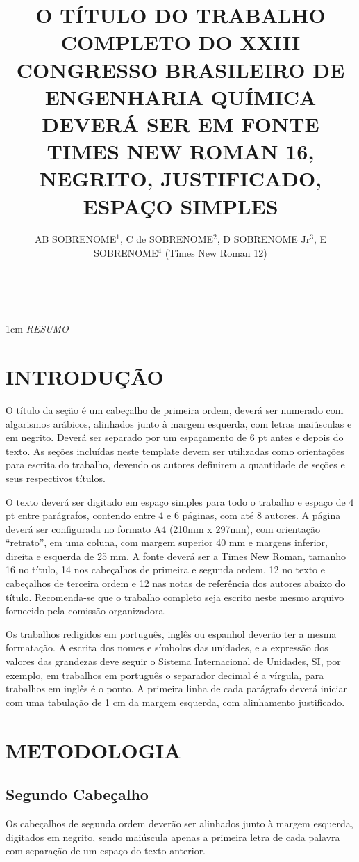 \documentclass[12pt,a4paper]{article}
\title{O TÍTULO DO TRABALHO COMPLETO DO XXIII CONGRESSO BRASILEIRO DE ENGENHARIA QUÍMICA DEVERÁ SER EM FONTE TIMES NEW ROMAN 16, NEGRITO, JUSTIFICADO, ESPAÇO SIMPLES}
\author{AB SOBRENOME$^1$, C de SOBRENOME$^2$, D SOBRENOME Jr$^3$, E SOBRENOME$^4$ (Times New Roman 12)}
\affiliation{%
$^1$ Universidade Federal da Bahia, Escola Politécnica, Departamento de Engenharia Química

$^2$ SENAI CIMATEC — Centro Integrado de Manufatura e Tecnologia

$^3$ Universidade Salvador

$^4$ Instituto Federal de Educação, Ciência e Tecnologia - Bahia

E-mail para contato: nome@wxyz.br
}
\makeatletter
\def\@affiliation{}
\def\@abstract{}
\renewcommand\maketitle{
   \vspace*{-1cm}
   {\noindent\Large\bfseries\@title\justifying}\\
   \begin{center}
   {\@author}   
   \end{center}
   
   \begin{center}
   {\setlength{\parskip}{0pt}
   \@affiliation
   }
   \end{center}

    \vspace*{\baselineskip}
   
    \begin{addmargin}[1cm]{1cm}
    {\itshape\noindent RESUMO-\@abstract}
    \end{addmargin}
    
  }
\makeatother
\begin{document}
\maketitle

\section{INTRODUÇÃO}

O título da seção é um cabeçalho de primeira ordem, deverá ser numerado com algarismos arábicos, alinhados junto à margem esquerda, com letras maiúsculas e em negrito. Deverá ser separado por um espaçamento de 6 pt antes e depois do texto. As seções incluídas neste template devem ser utilizadas como orientações para escrita do trabalho, devendo os autores definirem a quantidade de seções e seus respectivos títulos.

O texto deverá ser digitado em espaço simples para todo o trabalho e espaço de 4 pt entre parágrafos, contendo entre 4 e 6 páginas, com até 8 autores. A página deverá ser configurada no formato A4 (210mm x 297mm), com orientação ``retrato'', em uma coluna, com margem superior 40 mm e margens inferior, direita e esquerda de 25 mm. A fonte deverá ser a Times New Roman, tamanho 16 no título, 14 nos cabeçalhos de primeira e segunda ordem, 12 no texto e cabeçalhos de terceira ordem e 12 nas notas de referência dos autores abaixo do título. Recomenda-se que o trabalho completo seja escrito neste mesmo arquivo fornecido pela comissão organizadora.

Os trabalhos redigidos em português, inglês ou espanhol deverão ter a mesma formatação. A escrita dos nomes e símbolos das unidades, e a expressão dos valores das grandezas deve seguir o Sistema Internacional de Unidades, SI, por exemplo, em trabalhos em português o separador decimal é a vírgula, para trabalhos em inglês é o ponto.  A primeira linha de cada parágrafo deverá iniciar com uma tabulação de 1 cm da margem esquerda, com alinhamento justificado. 

\section{METODOLOGIA}

\subsection{Segundo Cabeçalho}

Os cabeçalhos de segunda ordem deverão ser alinhados junto à margem esquerda, digitados em negrito, sendo maiúscula apenas a primeira letra de cada palavra com separação de um espaço do texto anterior.
\end{document}
